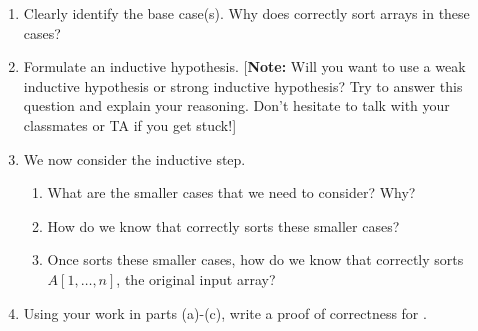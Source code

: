 \documentclass[11pt]{article}
\begin{document}
\begin{enumerate}
	\item Clearly identify the base case(s). Why does  correctly sort arrays in these cases?
	\item Formulate an inductive hypothesis. [\textbf{Note:} Will you want to use a weak inductive hypothesis or strong inductive hypothesis? Try to answer this question and explain your reasoning. Don't hesitate to talk with your classmates or TA if you get stuck!]

	\item We now consider the inductive step.
	\begin{enumerate}[label = \roman*.]
		\item What are the smaller cases that we need to consider? Why?
		\item How do we know that  correctly sorts these smaller cases?
		\item Once  sorts these smaller cases, how do we know that  correctly sorts $A[1, \ldots, n]$, the original input array?
	\end{enumerate}

	\item Using your work in parts (a)-(c), write a proof of correctness for .
\end{enumerate}
\end{document}
